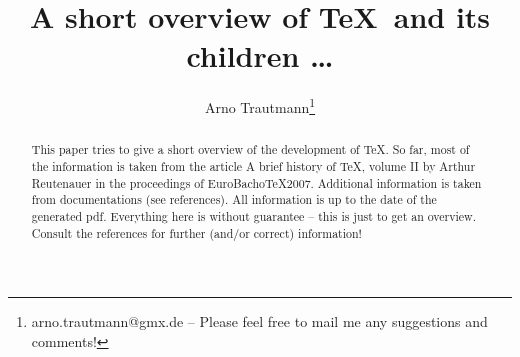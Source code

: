\documentclass{scrartcl}
\title{A short overview of \TeX\ and its children \dots}
\author{Arno Trautmann\thanks{arno.trautmann@gmx.de -- Please feel free to mail me any suggestions and comments!}}
\date{}
\begin{document}
\maketitle


\begin{abstract}
This paper tries to give a short overview of the development of \TeX. So far, most of the information is taken from the article \textsf{A brief history of \TeX, volume II} by Arthur Reutenauer in the proceedings of \textsf{EuroBacho\TeX 2007}. Additional information is taken from documentations (see references). All information is up to the date of the generated pdf. Everything here is without guarantee -- this is just to get an overview. Consult the references for further (and/or correct) information!
\end{abstract}

\newpage
\end{document}
